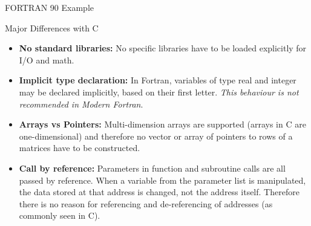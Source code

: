 \documentclass[10pt,t]{beamer}
\begin{document}
\begin{frame}[fragile]{FORTRAN 90 Example}
  \begin{eblock}{SAXPY Code}
    Fortran},basicstyle=\fontsize{6}{5}\selectfont\ttfamily]{./demo/saxpy.f90}
  \end{eblock}
\end{frame}

\begin{frame}{Major Differences with C}
  \begin{itemize}
    \item \textbf{No standard libraries:} No specific libraries have to be loaded explicitly for I/O and math.
    \item \textbf{Implicit type declaration:} In Fortran, variables of type real and integer may be declared implicitly, based on their first letter. {\em This behaviour is not recommended in Modern Fortran}.
    \item \textbf{Arrays vs Pointers:} Multi-dimension arrays are supported (arrays in C are one-dimensional) and therefore no vector or array of pointers to rows of a matrices have to be constructed.
    \item \textbf{Call by reference:} Parameters in function and subroutine calls are all passed by reference. When a variable from the parameter list is manipulated, the data stored at that address is changed, not the address itself. Therefore there is no reason for referencing and de-referencing of addresses (as commonly seen in C). 
  \end{itemize}
\end{frame}
\end{document}
